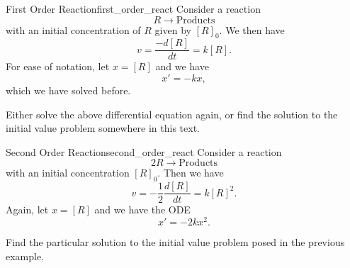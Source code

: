         \begin{ex}{First Order Reaction}{first_order_react}
        Consider a reaction
        \[
        R \to \textrm{Products}
        \]
        with an initial concentration of $R$ given by $[R]_0$. We then have
        \[
        v=\frac{-d[R]}{dt}=k[R].
        \]
        For ease of notation, let $x=[R]$ and we have
        \[
        x'=-kx,
        \]
        which we have solved before.
        \end{ex}

        \begin{exercise}
        Either solve the above differential equation again, or find the solution to the initial value problem somewhere in this text.
        \end{exercise}

        \begin{ex}{Second Order Reaction}{second_order_react}
        Consider a reaction
        \[
        2R \to \textrm{Products}
        \]
        with an initial concentration $[R]_0$.  Then we have
        \[
        v=-\frac{1}{2} \frac{d[R]}{dt}=k[R]^2.
        \]
        Again, let $x=[R]$ and we have the ODE
        \[
        x'=-2kx^2.
        \]
        \end{ex}

        \begin{exercise}
        Find the particular solution to the initial value problem posed in the previous example.
        \end{exercise}


